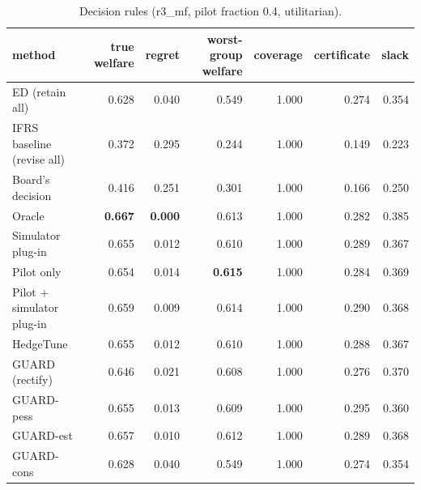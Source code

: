 \begin{table}[t]
\centering
\small
\begin{tabular}{lrrrrrr}
\toprule
method & true welfare & regret & worst-group welfare & coverage & certificate & slack \\
\midrule
ED (retain all) & 0.628 & 0.040 & 0.549 & 1.000 & 0.274 & 0.354 \\
IFRS baseline (revise all) & 0.372 & 0.295 & 0.244 & 1.000 & 0.149 & 0.223 \\
Board's decision & 0.416 & 0.251 & 0.301 & 1.000 & 0.166 & 0.250 \\
Oracle & \textbf{0.667} & \textbf{0.000} & 0.613 & 1.000 & 0.282 & 0.385 \\
Simulator plug-in & 0.655 & 0.012 & 0.610 & 1.000 & 0.289 & 0.367 \\
Pilot only & 0.654 & 0.014 & \textbf{0.615} & 1.000 & 0.284 & 0.369 \\
Pilot + simulator plug-in & 0.659 & 0.009 & 0.614 & 1.000 & 0.290 & 0.368 \\
HedgeTune & 0.655 & 0.012 & 0.610 & 1.000 & 0.288 & 0.367 \\
GUARD (rectify) & 0.646 & 0.021 & 0.608 & 1.000 & 0.276 & 0.370 \\
GUARD-pess & 0.655 & 0.013 & 0.609 & 1.000 & 0.295 & 0.360 \\
GUARD-est & 0.657 & 0.010 & 0.612 & 1.000 & 0.289 & 0.368 \\
GUARD-cons & 0.628 & 0.040 & 0.549 & 1.000 & 0.274 & 0.354 \\
\bottomrule
\end{tabular}
\caption{Decision rules (r3\_mf, pilot fraction 0.4, utilitarian).}
\label{tab:methods-utilitarian}
\end{table}
